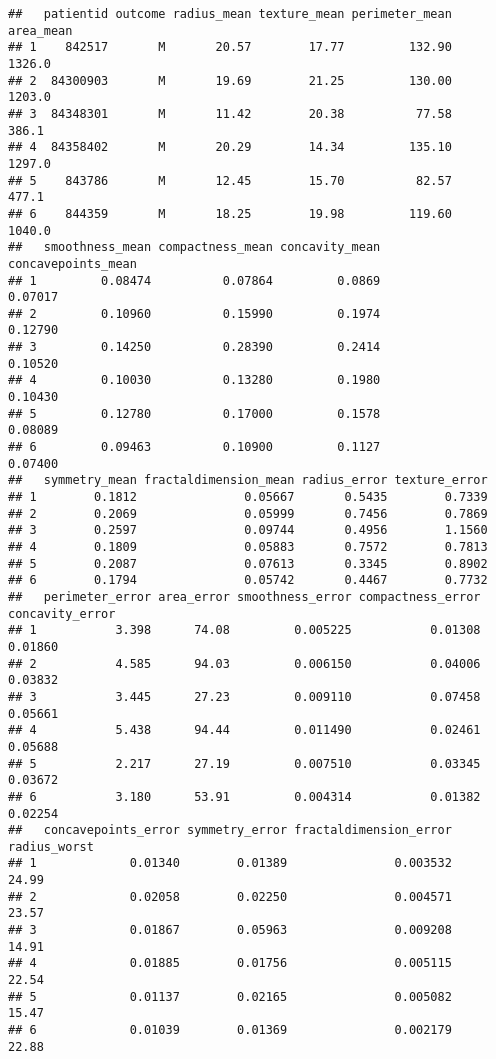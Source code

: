 \documentclass[
]{article}
\begin{document}
\begin{verbatim}
##   patientid outcome radius_mean texture_mean perimeter_mean area_mean
## 1    842517       M       20.57        17.77         132.90    1326.0
## 2  84300903       M       19.69        21.25         130.00    1203.0
## 3  84348301       M       11.42        20.38          77.58     386.1
## 4  84358402       M       20.29        14.34         135.10    1297.0
## 5    843786       M       12.45        15.70          82.57     477.1
## 6    844359       M       18.25        19.98         119.60    1040.0
##   smoothness_mean compactness_mean concavity_mean concavepoints_mean
## 1         0.08474          0.07864         0.0869            0.07017
## 2         0.10960          0.15990         0.1974            0.12790
## 3         0.14250          0.28390         0.2414            0.10520
## 4         0.10030          0.13280         0.1980            0.10430
## 5         0.12780          0.17000         0.1578            0.08089
## 6         0.09463          0.10900         0.1127            0.07400
##   symmetry_mean fractaldimension_mean radius_error texture_error
## 1        0.1812               0.05667       0.5435        0.7339
## 2        0.2069               0.05999       0.7456        0.7869
## 3        0.2597               0.09744       0.4956        1.1560
## 4        0.1809               0.05883       0.7572        0.7813
## 5        0.2087               0.07613       0.3345        0.8902
## 6        0.1794               0.05742       0.4467        0.7732
##   perimeter_error area_error smoothness_error compactness_error concavity_error
## 1           3.398      74.08         0.005225           0.01308         0.01860
## 2           4.585      94.03         0.006150           0.04006         0.03832
## 3           3.445      27.23         0.009110           0.07458         0.05661
## 4           5.438      94.44         0.011490           0.02461         0.05688
## 5           2.217      27.19         0.007510           0.03345         0.03672
## 6           3.180      53.91         0.004314           0.01382         0.02254
##   concavepoints_error symmetry_error fractaldimension_error radius_worst
## 1             0.01340        0.01389               0.003532        24.99
## 2             0.02058        0.02250               0.004571        23.57
## 3             0.01867        0.05963               0.009208        14.91
## 4             0.01885        0.01756               0.005115        22.54
## 5             0.01137        0.02165               0.005082        15.47
## 6             0.01039        0.01369               0.002179        22.88

\end{verbatim}
\end{document}
